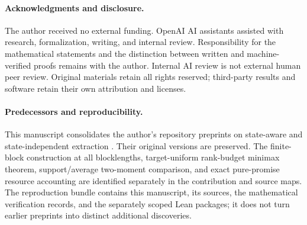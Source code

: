 \paragraph{Acknowledgments and disclosure.}
The author received no external funding. OpenAI AI assistants assisted with research, formalization, writing, and internal review. Responsibility for the mathematical statements and the distinction between written and machine-verified proofs remains with the author. Internal AI review is not external human peer review. Original materials retain all rights reserved; third-party results and software retain their own attribution and licenses.

\paragraph{Predecessors and reproducibility.}
This manuscript consolidates the author's repository preprints on state-aware and state-independent extraction \cite{zhang-extraction,zhang-universal}. Their original versions are preserved. The finite-block construction at all blocklengths, target-uniform rank-budget minimax theorem, support/average two-moment comparison, and exact pure-promise resource accounting are identified separately in the contribution and source maps. The reproduction bundle contains this manuscript, its sources, the mathematical verification records, and the separately scoped Lean packages; it does not turn earlier preprints into distinct additional discoveries.
